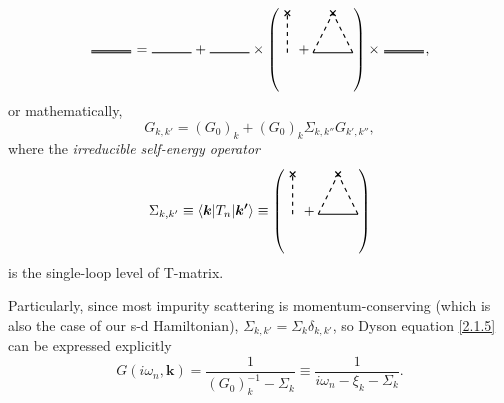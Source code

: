 \documentclass[aps,prx,superscriptaddress,onecolumn,preprintnumbers,nofootinbib,longbibliography]{revtex4-1}
\def\cross{\tikz[scale=0.1,baseline=.1ex]{
	\draw[thick,rotate=45] (-1,0)--(1,0);
	\draw[thick,rotate=45] (0,-1)--(0,1);}
	}
\begin{document}
		\begin{equation*}
			\begin{tikzpicture}
				\draw[double,thick] (0,0)--(1,0);
			\end{tikzpicture}
			=
			\begin{tikzpicture}
				\draw[thick] (0,0)--(1,0);
			\end{tikzpicture}
			+
			\begin{tikzpicture}
				\draw[thick] (0,0)--(1,0);
			\end{tikzpicture}
			\times
			\left(\begin{tikzpicture}
				\draw[thick,dashed] (0,0)--(0,1);
				\node at (0,1) {\cross};
			\end{tikzpicture}
			+
			\begin{tikzpicture}
				\draw[thick] (0,0)--(1,0);
				\draw[thick,dashed] (0,0)--(0.5,1);
				\draw[thick,dashed] (1,0)--(0.5,1);
				\node at (0.5,1) {\cross};
			\end{tikzpicture}\right)
			\times
			\begin{tikzpicture}
				\draw[double,thick] (0,0)--(1,0);
			\end{tikzpicture},
		\end{equation*}
		or mathematically,
		\begin{equation}\label{2.1.5}
			G_{k,k'}=(G_0)_k+(G_0)_k\Sigma_{k,k''}G_{k',k''},
		\end{equation}
		where the \emph{irreducible self-energy operator}
		\begin{equation*}
			\Sigma_{k,k'}\equiv\langle\bm{k}|T_n|\bm{k'}\rangle\equiv\left(\begin{tikzpicture}
				\draw[thick,dashed] (0,0)--(0,1);
				\node at (0,1) {\cross};
			\end{tikzpicture}
			+
			\begin{tikzpicture}
				\draw[thick] (0,0)--(1,0);
				\draw[thick,dashed] (0,0)--(0.5,1);
				\draw[thick,dashed] (1,0)--(0.5,1);
				\node at (0.5,1) {\cross};
			\end{tikzpicture}\right)
		\end{equation*}
		is the single-loop level of T-matrix.\par
		Particularly, since most impurity scattering is momentum-conserving (which is also the case of our s-d Hamiltonian), $\Sigma_{k,k'}=\Sigma_k\delta_{k,k'}$, so Dyson equation \eqref{2.1.5} can be expressed explicitly
		\begin{equation}\label{2.1.6}
			G(i\omega_n,\bm{k})=\dfrac{1}{(G_0)_k^{-1}-\Sigma_k}\equiv\dfrac{1}{i\omega_n-\xi_k-\Sigma_k}.
		\end{equation}
\end{document}
